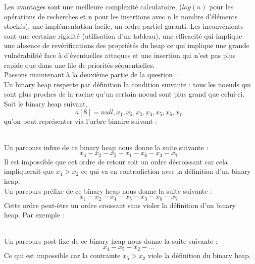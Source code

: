 \documentclass[11pt]{article}
\begin{document}
\begin{enumerate}
Les avantages sont une meilleure complexité calculatoire, 
($log(n)$ pour les opérations de recherches et n pour les insertions avec n le nombre d'éléments stockés),
une implémentation facile, un ordre partiel garanti. Les inconvénients sont une certaine
rigidité (utilisation d'un tableau), une efficacité qui implique une absence de
revérifications des propriétés du heap ce qui implique une grande vulnérabilité face à
d'éventuelles attaques et une insertion qui n'est pas plus rapide que dans une file de
priorités séquentielles.\\
Passons maintenant à la deuxième partie de la question : \\
Un binary heap respecte par définition la condition suivante : tous les noeuds qui sont plus proches de la racine qu'un certain noeud sont plus grand que celui-ci.
Soit le binary heap suivant,
$$ a[8] = {null, x_1, x_2, x_3, x_4, x_5, x_6, x_7} $$
qu'on peut représenter via l'arbre binaire suivant :\\
\\
Un parcours infixe de ce binary heap nous donne la suite suivante :
$$ x_4 - x_2 - x_5 - x_1 - x_6 - x_3 - x_7 $$
Il est impossible que cet ordre de retour soit un ordre décroissant car cela impliquerait que $ x_4  > x_2 $ ce qui va en contradiction avec la définition d'un binary heap. \\
Un parcours préfixe de ce binary heap nous donne la suite suivante :
$$ x_1 - x_2 - x_4 - x_5 - x_3 - x_6 - x_7 $$
Cette ordre peut-être un ordre croissant sans violer la définition d'un binary heap. Par exemple : \\
\\

Un parcours post-fixe de ce binary heap nous donne la suite suivante :
$$ x_4 - x_5 - x_2 - ... $$
Ce qui est impossible car la contrainte $ x_5 > x_2 $ viole la définition du binary heap.


\end{enumerate}
\end{document}
